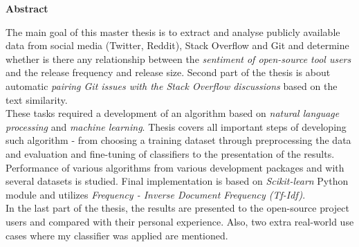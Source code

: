 \begin{center}
\textbf{Abstract}
\end{center}

The main goal of this master thesis is to extract and analyse publicly available data from social media (Twitter, Reddit), Stack Overflow and Git and determine whether is there any relationship between the \textit{sentiment of open-source tool users} and the release frequency and release size. Second part of the thesis is about automatic \textit{pairing Git issues with the Stack Overflow discussions} based on the text similarity.\\
These tasks required a development of an algorithm based on \textit{natural language processing} and \textit{machine learning}. Thesis covers all important steps of developing such algorithm - from choosing a training dataset through preprocessing the data and evaluation and fine-tuning of classifiers to the presentation of the results. Performance of various algorithms from various development packages and with several datasets is studied. Final implementation is based on \textit{Scikit-learn} Python module and utilizes \textit{Frequency - Inverse Document Frequency (Tf-Idf)}.\\
In the last part of the thesis, the results are presented to the open-source project users and compared with their personal experience. Also, two extra real-world use cases where my classifier was applied are mentioned.